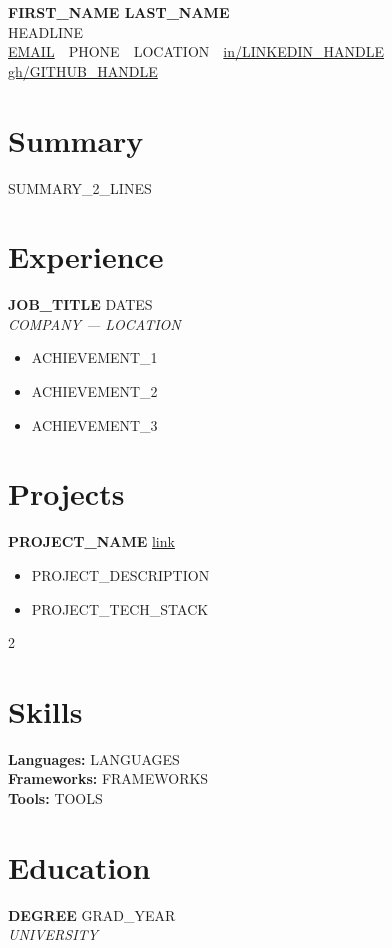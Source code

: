 \documentclass[10pt,a4paper]{article}
\begin{document}
{\Huge\bfseries\color{accent} {{FIRST_NAME}} {{LAST_NAME}}}\\[3pt]
{\large {{HEADLINE}}}\\[5pt]
{\footnotesize
  \href{mailto:{{EMAIL}}}{{{EMAIL}}} \,\textbullet\,
  {{PHONE}} \,\textbullet\, {{LOCATION}} \,\textbullet\,
  \href{https://linkedin.com/in/{{LINKEDIN_HANDLE}}}{in/{{LINKEDIN_HANDLE}}} \,\textbullet\,
  \href{https://github.com/{{GITHUB_HANDLE}}}{gh/{{GITHUB_HANDLE}}}}

\vspace{4pt}

\section{Summary}
{{SUMMARY_2_LINES}}

\section{Experience}
\textbf{{{JOB_TITLE}}} \hfill {\color{accent}\small {{DATES}}}\\
{\small\itshape {{COMPANY}} — {{LOCATION}}}
\begin{itemize}[leftmargin=*,nosep,itemsep=2pt]
  \item {{ACHIEVEMENT_1}}
  \item {{ACHIEVEMENT_2}}
  \item {{ACHIEVEMENT_3}}
\end{itemize}

\section{Projects}
\textbf{{{PROJECT_NAME}}} \hfill {\color{accent}\small \href{{{PROJECT_URL}}}{link}}
\begin{itemize}[leftmargin=*,nosep,itemsep=2pt]
  \item {{PROJECT_DESCRIPTION}}
  \item {{PROJECT_TECH_STACK}}
\end{itemize}

\begin{paracol}{2}
\section{Skills}
\textbf{Languages:} {{LANGUAGES}}\\
\textbf{Frameworks:} {{FRAMEWORKS}}\\
\textbf{Tools:} {{TOOLS}}
\switchcolumn
\section{Education}
\textbf{{{DEGREE}}} \hfill {\color{accent}\small {{GRAD_YEAR}}}\\
{\small\itshape {{UNIVERSITY}}}
\end{paracol}
\end{document}
